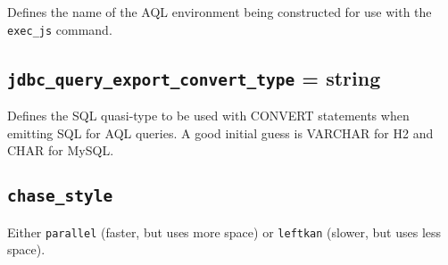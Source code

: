 \documentclass[10pt]{book}
\begin{document}
Defines the name of the AQL environment being constructed for use with the {\tt exec\_js} command.

\subsection{{\tt jdbc\_query\_export\_convert\_type} = string}

Defines the SQL quasi-type to be used with CONVERT statements when emitting SQL for AQL queries.  A good initial guess is VARCHAR for H2 and CHAR for MySQL.

\subsection{{\tt chase\_style}}

Either {\tt parallel} (faster, but uses more space) or {\tt leftkan} (slower, but uses less space).
\end{document}
